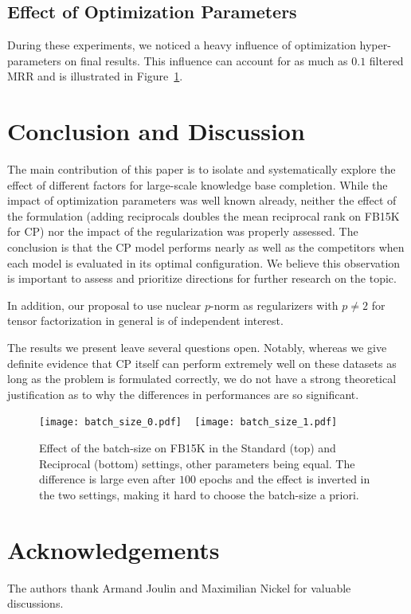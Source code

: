 \documentclass{article}
\newcommand{\CP}{{CP}\xspace}
\newcommand{\fb}{{FB15K}\xspace}
\begin{document}
\subsection{Effect of Optimization Parameters}

During these experiments, we noticed a heavy influence of optimization hyper-parameters on final results. This influence can account for as much as $0.1$ filtered MRR and is illustrated in Figure~\ref{fig:optimization}.

\section{Conclusion and Discussion}
The main contribution of this paper is to isolate and systematically explore the effect of different factors for large-scale knowledge base completion. While the impact of optimization parameters was well known already, neither the effect of the formulation (adding reciprocals doubles the mean reciprocal rank on \fb for \CP) nor the impact of the regularization was properly assessed. The conclusion is that the \CP model performs nearly as well as the competitors when each model is evaluated in its optimal configuration. We believe this observation is important to assess and prioritize directions for further research on the topic. 

In addition, our proposal to use nuclear $p$-norm as regularizers with $p\neq 2$ for tensor factorization in general is of independent interest. 

The results we present leave several questions open. Notably, whereas we give definite evidence that \CP itself can perform extremely well on these datasets as long as the problem is formulated correctly, we do not have a strong theoretical justification as to why the differences in performances are so significant.

\begin{figure}
\centering
\texttt{[image: batch\_size\_0.pdf]}
~
\texttt{[image: batch\_size\_1.pdf]}
\caption{Effect of the batch-size on \fb in the Standard (top) and Reciprocal (bottom) settings, other parameters being equal. The difference is large even after $100$ epochs and the effect is inverted in the two settings, making it hard to choose the batch-size a priori.
}
\label{fig:optimization}
\end{figure}

\section*{Acknowledgements}
The authors thank Armand Joulin and Maximilian Nickel for valuable discussions.
\end{document}
